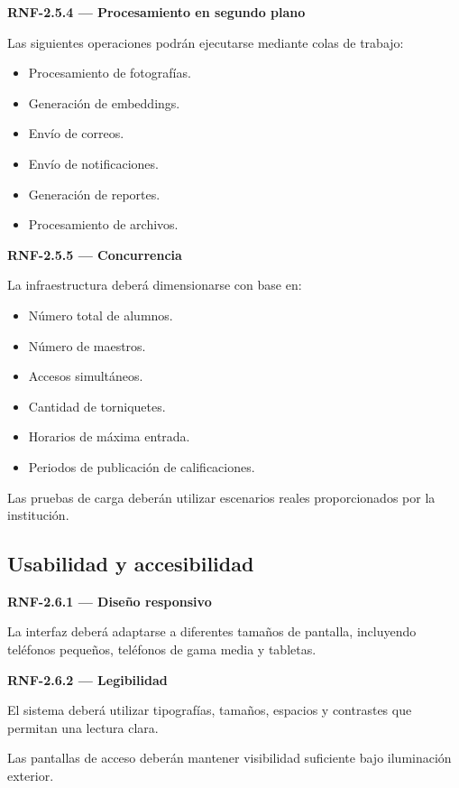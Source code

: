 \documentclass[12pt,a4paper]{article}
\newcommand{\RNF}[1]{\textbf{\color{secondary}RNF-#1}}
\newenvironment{requisito}[1]
{
\begin{center}
\begin{minipage}{0.96\textwidth}
\colorbox{requirement}{
\begin{minipage}{0.94\textwidth}
\textbf{#1}
\end{minipage}
}
\vspace{2mm}
}
{
\end{minipage}
\end{center}
}
\begin{document}
\begin{requisito}{\RNF{2.5.4} --- Procesamiento en segundo plano}
Las siguientes operaciones podrán ejecutarse mediante colas de trabajo:

\begin{itemize}[leftmargin=*]
\item Procesamiento de fotografías.
\item Generación de embeddings.
\item Envío de correos.
\item Envío de notificaciones.
\item Generación de reportes.
\item Procesamiento de archivos.
\end{itemize}
\end{requisito}

\begin{requisito}{\RNF{2.5.5} --- Concurrencia}
La infraestructura deberá dimensionarse con base en:

\begin{itemize}[leftmargin=*]
\item Número total de alumnos.
\item Número de maestros.
\item Accesos simultáneos.
\item Cantidad de torniquetes.
\item Horarios de máxima entrada.
\item Periodos de publicación de calificaciones.
\end{itemize}

Las pruebas de carga deberán utilizar escenarios reales proporcionados por la
institución.
\end{requisito}

\subsection{Usabilidad y accesibilidad}

\begin{requisito}{\RNF{2.6.1} --- Diseño responsivo}
La interfaz deberá adaptarse a diferentes tamaños de pantalla, incluyendo
teléfonos pequeños, teléfonos de gama media y tabletas.
\end{requisito}

\begin{requisito}{\RNF{2.6.2} --- Legibilidad}
El sistema deberá utilizar tipografías, tamaños, espacios y contrastes que
permitan una lectura clara.

Las pantallas de acceso deberán mantener visibilidad suficiente bajo iluminación
exterior.
\end{requisito}
\end{document}
